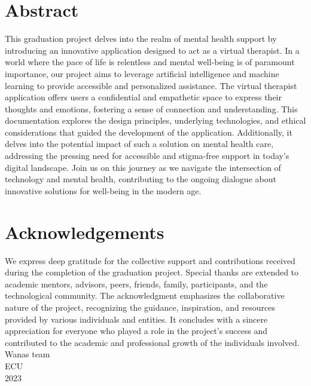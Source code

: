\documentclass[11pt]{report}
\begin{document}


    \maketitle

\chapter*{Abstract}
This graduation project delves into the realm of mental health support by introducing an innovative application designed to act as a virtual therapist. In a world where the pace of life is relentless and mental well-being is of paramount importance, our project aims to leverage artificial intelligence and machine learning to provide accessible and personalized assistance. The virtual therapist application offers users a confidential and empathetic space to express their thoughts and emotions, fostering a sense of connection and understanding. This documentation explores the design principles, underlying technologies, and ethical considerations that guided the development of the application. Additionally, it delves into the potential impact of such a solution on mental health care, addressing the pressing need for accessible and stigma-free support in today's digital landscape. Join us on this journey as we navigate the intersection of technology and mental health, contributing to the ongoing dialogue about innovative solutions for well-being in the modern age.

\chapter*{Acknowledgements}
We express deep gratitude for the collective support and contributions received during the completion of the graduation project. Special thanks are extended to academic mentors, advisors, peers, friends, family, participants, and the technological community. The acknowledgment emphasizes the collaborative nature of the project, recognizing the guidance, inspiration, and resources provided by various individuals and entities. It concludes with a sincere appreciation for everyone who played a role in the project's success and contributed to the academic and professional growth of the individuals involved.
Wanas team\\
ECU\\
2023
\tableofcontents 
\listoffigures
\end{document}
